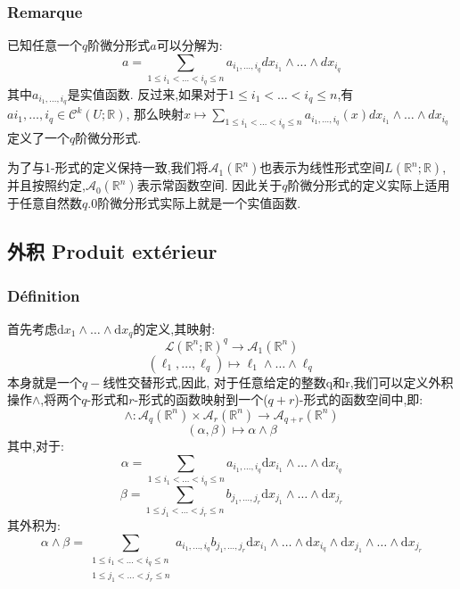 \documentclass[12pt, a4paper, oneside]{ctexbook}
\newcommand{\di }{\text{d}}%
\newcommand{\R }{\mathbb{R}}%
\begin{document}
  \subsubsection{Remarque}
  已知任意一个$q$阶微分形式$a$可以分解为:
  $$a = \sum\limits_{1\leq i_1<\ldots<i_q\leq n} a_{i_1,\ldots,i_q} dx_{i_1} \wedge \ldots \wedge dx_{i_q}$$
  其中$a_{i_1,\ldots,i_q}$是实值函数.
  反过来,如果对于$1 \leq i_1 < \ldots < i_q \leq n$,有$ai_1,\ldots,i_q \in \mathcal{C}^k(U; \mathbb{R})$,
  那么映射$x \mapsto \sum\limits_{1\leq i_1<\ldots<i_q\leq n} a_{i_1,\ldots,i_q}(x) dx_{i_1} \wedge \ldots \wedge dx_{i_q}$定义了一个$q$阶微分形式.


  为了与1-形式的定义保持一致,我们将$\mathcal{A}_1(\mathbb{R}^n)$也表示为线性形式空间$L(\mathbb{R}^n; \mathbb{R})$,并且按照约定,$\mathcal{A}_0(\mathbb{R}^n)$表示常函数空间.
  因此关于$q$阶微分形式的定义实际上适用于任意自然数$q$.0阶微分形式实际上就是一个实值函数.
  \subsection{外积 Produit extérieur}
  \subsubsection{Définition}
  首先考虑$\di x_1\wedge\dots\wedge\di x_q $的定义,其映射:
  $$
  \mathcal{L}(\R^n;\R)^q\to \mathcal{A}_1(\R^n)
  $$
  $$
  (\ell_1,\dots,\ell_q)\mapsto\ell_1\wedge\dots\wedge\ell_q
  $$
  本身就是一个$q-$线性交替形式,因此,
  对于任意给定的整数q和r,我们可以定义外积操作$\wedge$,将两个$q$-形式和$r$-形式的函数映射到一个($q+r$)-形式的函数空间中,即:
  $$
  \wedge:\mathcal{A}_q(\R^n)\times\mathcal{A}_r(\R^n)\to\mathcal{A}_{q+r}(\R^n)
  $$
  $$
  (\alpha,\beta)\mapsto\alpha\wedge\beta
  $$
  其中,对于:
  $$
  \alpha=\sum\limits_{1\leq i_1<\ldots<i_q\leq n}a_{i_1,\ldots,i_q}\di x_{i_1}\wedge\ldots\wedge\di x_{i_q}
  $$
  $$
  \beta=\sum\limits_{1\leq j_1<\ldots<j_r\leq n}b_{j_1,\ldots,j_r}\di x_{j_1}\wedge\ldots\wedge\di x_{j_r}
  $$
  其外积为:
  $$
  \alpha\wedge\beta=\sum\limits_{\substack{1\leq i_1<\ldots<i_q\leq n\\1\leq j_1<\ldots<j_r\leq n}}a_{i_1,\ldots,i_q}b_{j_1,\ldots,j_r}\di x_{i_1}\wedge\ldots\wedge\di x_{i_q}\wedge\di x_{j_1}\wedge\ldots\wedge\di x_{j_r}
  $$
\end{document}
